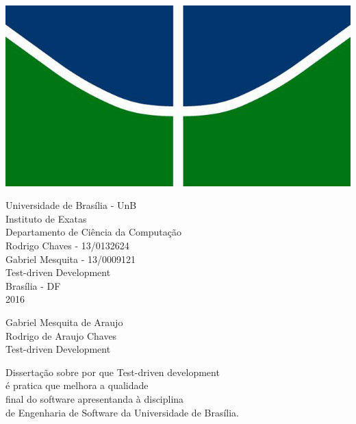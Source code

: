 \documentclass[12pt]{article}
\begin{document}
    \begin{center}
    \includegraphics[scale=0.5]{unb}
    \par
    \vspace{15mm}
    \normalsize{Universidade de Brasília - UnB}\\
    \normalsize{Instituto de Exatas}\\
    \normalsize{Departamento de Ciência da Computação}\\
    \vspace{15mm}
    \normalsize{Rodrigo Chaves - 13/0132624}\\
    \normalsize{Gabriel Mesquita - 13/0009121}\\
    \vspace{15mm}
    \Huge{Test-driven Development}\\

    \vspace{60mm}
    \normalsize{Brasília - DF}\\
    \textnormal{2016}
  \end{center}

  \clearpage

  \begin{center}
    Gabriel Mesquita de Araujo\\
    Rodrigo de Araujo Chaves\\
    \vspace{30mm}
    \Huge{Test-driven Development}
    \vspace{30mm}
    \normalsize{}
    \begin{flushright}
      Dissertação sobre por que Test-driven development\\
      é pratica que melhora a qualidade\\
      final do software apresentanda à disciplina\\
      de Engenharia de Software da Universidade de Brasília.\\
    \end{flushright}
  \end{center}
\end{document}
